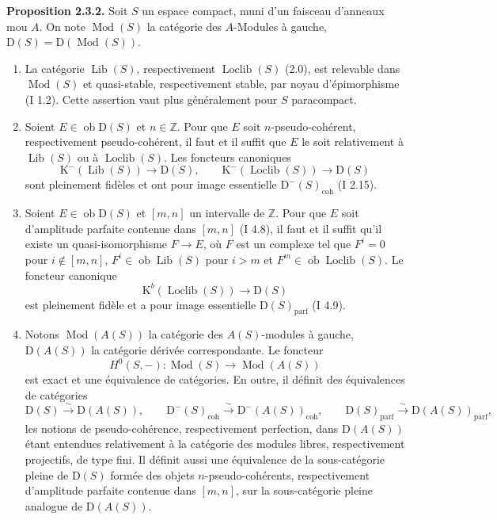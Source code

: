 \documentclass[11pt]{article}
\providecommand{\Mod}{\operatorname{Mod}}
\providecommand{\Lib}{\operatorname{Lib}}
\providecommand{\Loclib}{\operatorname{Loclib}}
\providecommand{\Ob}{\operatorname{ob}}
\providecommand{\coh}{\operatorname{coh}}
\providecommand{\parf}{\operatorname{parf}}
\begin{document}
\textbf{Proposition 2.3.2.} Soit $S$ un espace compact, muni d'un faisceau d'anneaux mou $A$. On note $\Mod(S)$ la catégorie des $A$-Modules à gauche, $\mathrm D(S)=\mathrm D(\Mod(S))$.
\begin{enumerate}[label=\alph*)]
\item La catégorie $\Lib(S)$, respectivement $\Loclib(S)$ (2.0), est relevable dans $\Mod(S)$ et quasi-stable, respectivement stable, par noyau d'épimorphisme (I 1.2). Cette assertion vaut plus généralement pour $S$ paracompact.
\item Soient $E\in\Ob\mathrm D(S)$ et $n\in\mathbb Z$. Pour que $E$ soit $n$-pseudo-cohérent, respectivement pseudo-cohérent, il faut et il suffit que $E$ le soit relativement à $\Lib(S)$ ou à $\Loclib(S)$. Les foncteurs canoniques
\[
\mathrm K^{-}(\Lib(S))\longrightarrow \mathrm D(S),
\qquad
\mathrm K^{-}(\Loclib(S))\longrightarrow \mathrm D(S)
\]
sont pleinement fidèles et ont pour image essentielle $\mathrm D^{-}(S)_{\coh}$ (I 2.15).
\item Soient $E\in\Ob\mathrm D(S)$ et $[m,n]$ un intervalle de $\mathbb Z$. Pour que $E$ soit d'amplitude parfaite contenue dans $[m,n]$ (I 4.8), il faut et il suffit qu'il existe un quasi-isomorphisme $F\to E$, où $F$ est un complexe tel que $F^i=0$ pour $i\notin[m,n]$, $F^i\in\Ob\Lib(S)$ pour $i>m$ et $F^m\in\Ob\Loclib(S)$. Le foncteur canonique
\[
\mathrm K^b(\Loclib(S))\longrightarrow\mathrm D(S)
\]
est pleinement fidèle et a pour image essentielle $\mathrm D(S)_{\parf}$ (I 4.9).
\item Notons $\Mod(A(S))$ la catégorie des $A(S)$-modules à gauche, $\mathrm D(A(S))$ la catégorie dérivée correspondante. Le foncteur
\[
H^0(S,-):\Mod(S)\longrightarrow\Mod(A(S))
\]
est exact et une équivalence de catégories. En outre, il définit des équivalences de catégories
\[
\mathrm D(S)\xrightarrow{\sim}\mathrm D(A(S)),\qquad
\mathrm D^{-}(S)_{\coh}\xrightarrow{\sim}\mathrm D^{-}(A(S))_{\coh},\qquad
\mathrm D(S)_{\parf}\xrightarrow{\sim}\mathrm D(A(S))_{\parf},
\]
les notions de pseudo-cohérence, respectivement perfection, dans $\mathrm D(A(S))$ étant entendues relativement à la catégorie des modules libres, respectivement projectifs, de type fini. Il définit aussi une équivalence de la sous-catégorie pleine de $\mathrm D(S)$ formée des objets $n$-pseudo-cohérents, respectivement d'amplitude parfaite contenue dans $[m,n]$, sur la sous-catégorie pleine analogue de $\mathrm D(A(S))$.
\end{enumerate}
\end{document}
